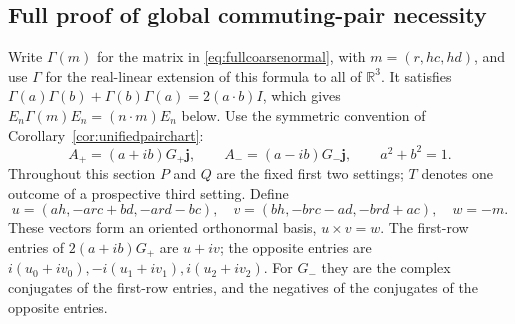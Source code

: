 \documentclass[11pt]{article}
\begin{document}
\subsection{Full proof of global commuting-pair necessity}\label{sec:globalexhaustion}
Write $\Gamma(m)$ for the matrix in \eqref{eq:fullcoarsenormal}, with
$m=(r,hc,hd)$, and use $\Gamma$ for the real-linear extension of this
formula to all of $\mathbb R^3$. It satisfies
$\Gamma(a)\Gamma(b)+\Gamma(b)\Gamma(a)=2(a\cdot b)I$, which gives
$E_n\Gamma(m)E_n=(n\cdot m)E_n$ below. Use the symmetric convention of
Corollary~\ref{cor:unifiedpairchart}:
\[
 A_+=(a+ib)G_+\mathbf j,\qquad A_-=(a-ib)G_-\mathbf j,
 \qquad a^2+b^2=1.
\]
Throughout this section $P$ and $Q$ are the fixed first two settings;
$T$ denotes one outcome of a prospective third setting. Define
\[
 u=(ah,-arc+bd,-ard-bc),\quad
 v=(bh,-brc-ad,-brd+ac),\quad w=-m.
\]
These vectors form an oriented orthonormal basis, $u\times v=w$.
The first-row entries of $2(a+ib)G_+$ are $u+iv$; the opposite entries
are $i(u_0+iv_0),-i(u_1+iv_1),i(u_2+iv_2)$.
For $G_-$ they are the complex conjugates of the first-row entries,
and the negatives of the conjugates of the opposite entries.
\end{document}
